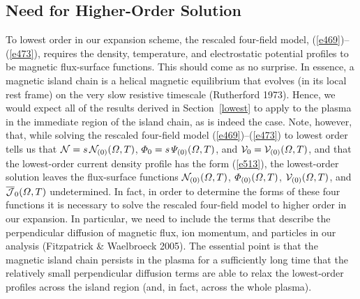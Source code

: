 \documentclass[notitlepage,12pt]{article}
\begin{document}
\subsection{Need for Higher-Order Solution}
To lowest order in our expansion scheme, the rescaled four-field model, (\ref{e469})--(\ref{e473}), requires the density, temperature, and  
electrostatic potential profiles to be magnetic flux-surface functions. This should come as no surprise. In essence,
a magnetic island chain is a helical magnetic equilibrium that evolves (in its local rest frame) on the very
slow resistive timescale (Rutherford 1973). Hence, we would expect all of the results derived in Section~\ref{lowest}
to apply to the plasma in the immediate region of the island chain, as is indeed the case. Note, however, that, 
while solving the  rescaled four-field model (\ref{e469})--(\ref{e473}) to lowest order  tells us that
${\cal N}=s\,{\cal N}_{(0)}({\mit\Omega},T)$, ${\mit\Phi}_0 =s\,{\mit\Psi}_{(0)}({\mit\Omega},T)$, and
${\cal V}_0 = {\cal V}_{(0)}({\mit\Omega},T)$, and that the lowest-order current density profile has the form (\ref{e513}), the lowest-order solution leaves the  flux-surface functions ${\cal N}_{(0)}({\mit\Omega},T)$,
${\mit\Phi}_{(0)}({\mit\Omega},T)$,  ${\cal V}_{(0)}({\mit\Omega},T)$, and $\overline{\cal J}_0({\mit\Omega},T)$ undetermined. In fact, in order to determine
the forms of these  four  functions it is necessary to solve the rescaled four-field model to higher order in our expansion. In particular,
we need to include the terms that describe the perpendicular diffusion of magnetic flux, ion momentum, and
particles in our analysis (Fitzpatrick \& Waelbroeck 2005). The essential point is that the magnetic island
chain persists in the plasma for a sufficiently long time that  the relatively small perpendicular diffusion
terms are able to relax the lowest-order profiles across the island region (and, in fact, across the whole plasma). 
\end{document}
